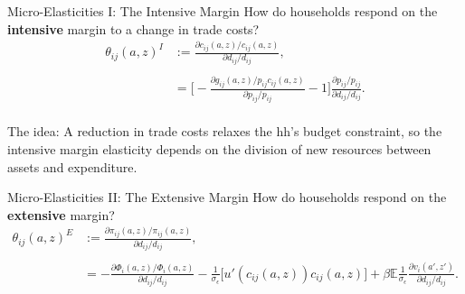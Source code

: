 \documentclass[9pt,pdftex,aspectratio=1610]{beamer}
\theoremstyle{definition}
\begin{document}

\begin{frame}[t]{Micro-Elasticities I: The Intensive Margin}
\smallskip
How do households respond on the \textbf{intensive} margin to a change in trade costs?
\begin{align*}
\theta_{ij}(a,z)^{I} & := \frac{\partial c_{ij}(a,z)/ c_{ij}(a,z)}{\partial d_{ij} / d_{ij}}, \\
\\
& = \bigg [-\frac{\partial g_{ij}(a,z)/ p_{ij}c_{ij}(a,z)}{\partial p_{ij}/ p_{ij}} - 1 \bigg ]\frac{\partial p_{ij}/p_{ij}}{\partial d_{ij}/ d_{ij}}.
\end{align*}\\
\bigskip
\medskip
The idea: A reduction in trade costs relaxes the hh's budget constraint, so the intensive margin elasticity depends on the division of new resources between assets and expenditure.
\end{frame}


\begin{frame}[t]{Micro-Elasticities II: The Extensive Margin}
\smallskip
How do households respond on the \textbf{extensive} margin?
\begin{align*}
\theta_{ij}(a,z)^{E} &:= \frac{\partial \pi_{ij}(a,z) / \pi_{ij}(a,z)}{\partial d_{ij} / d_{ij}}, \\
\nonumber \\
& = - \frac{\partial \Phi_{i}(a,z) / \Phi_{i}(a,z)}{\partial d_{ij}/d_{ij}} -\frac{1}{\sigma_{\epsilon}}\bigg[u'(c_{ij}(a,z))c_{ij}(a,z)\bigg] + \beta \mathbb{E}\frac{1}{\sigma_{\epsilon}}\frac{\partial v_{i}(a',z')}{\partial d_{ij}/ d_{ij}}.
\end{align*}\\
\medskip
\bigskip
{}
\end{frame}
\end{document}
